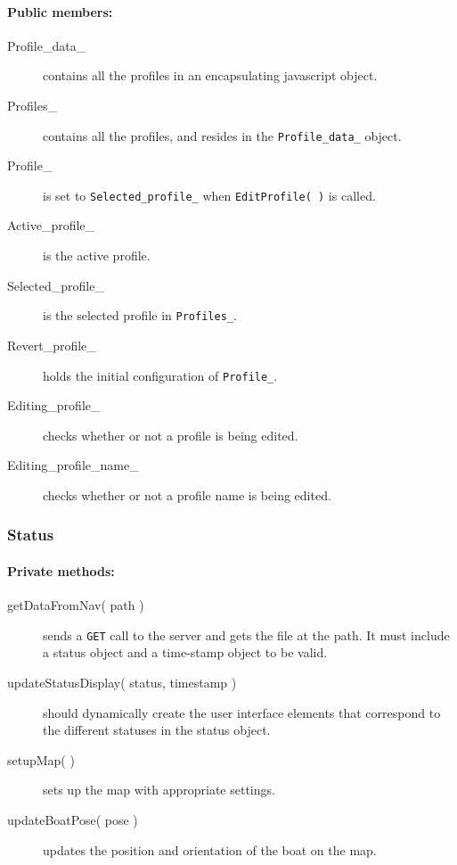 \paragraph{Public members:}
\begin{adjustwidth}{2.5em}{0pt}\begin{description}
	\item [Profile_data_] contains all the profiles in an encapsulating javascript object.
	\item [Profiles_] contains all the profiles, and resides in the \texttt{Profile_data_} object.
	\item [Profile_] is set to \texttt{Selected_profile_} when \texttt{EditProfile( )} is called.
	\item [Active_profile_] is the active profile.
	\item [Selected_profile_] is the selected profile in \texttt{Profiles_}.
	\item [Revert_profile_] holds the initial configuration of \texttt{Profile_}.
	\item [Editing_profile_] checks whether or not a profile is being edited.
	\item [Editing_profile_name_] checks whether or not a profile name is being edited.
\end{description}\end{adjustwidth}

\subsubsection{Status}


\paragraph{Private methods:}
\begin{adjustwidth}{2.5em}{0pt}\begin{description}
		\item [getDataFromNav( path )] sends a \texttt{GET} call to the server and gets the file at the path. It must include a status object and a time-stamp object to be valid.
		\item [updateStatusDisplay( status, timestamp )] should dynamically create the user interface elements that correspond to the different statuses in the status object. 
		\item [setupMap( )] sets up the map with appropriate settings.
		\item [updateBoatPose( pose )] updates the position and orientation of the boat on the map.
\end{description}\end{adjustwidth}

